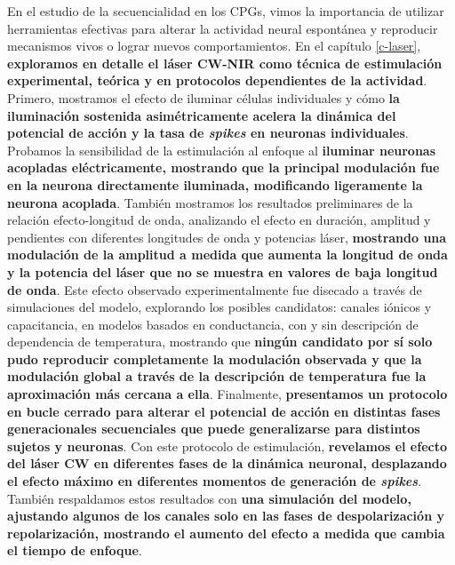 En el estudio de la secuencialidad en los CPGs, vimos la importancia de utilizar herramientas efectivas para alterar la actividad neural espontánea y reproducir mecanismos vivos o lograr nuevos comportamientos. En el capítulo \ref{c-laser}, \textbf{exploramos en detalle el láser CW-NIR como técnica de estimulación experimental, teórica y en protocolos dependientes de la actividad}. Primero, mostramos el efecto de iluminar células individuales y cómo \textbf{la iluminación sostenida asimétricamente acelera la dinámica del potencial de acción y la tasa de \textit{spikes} en neuronas individuales}. Probamos la sensibilidad de la estimulación al enfoque al \textbf{iluminar neuronas acopladas eléctricamente, mostrando que la principal modulación fue en la neurona directamente iluminada, modificando ligeramente la neurona acoplada}. También mostramos los resultados preliminares de la relación efecto-longitud de onda, analizando el efecto en duración, amplitud y pendientes con diferentes longitudes de onda y potencias láser, \textbf{mostrando una modulación de la amplitud a medida que aumenta la longitud de onda y la potencia del láser que no se muestra en valores de baja longitud de onda}. Este efecto observado experimentalmente fue disecado a través de simulaciones del modelo, explorando los posibles candidatos: canales iónicos y capacitancia, en modelos basados en conductancia, con y sin descripción de dependencia de temperatura, mostrando que \textbf{ningún candidato por sí solo pudo reproducir completamente la modulación observada y que la modulación global a través de la descripción de temperatura fue la aproximación más cercana a ella}. Finalmente, \textbf{presentamos un protocolo en bucle cerrado para alterar el potencial de acción en distintas fases generacionales secuenciales que puede generalizarse para distintos sujetos y neuronas}. Con este protocolo de estimulación, \textbf{revelamos el efecto del láser CW en diferentes fases de la dinámica neuronal, desplazando el efecto máximo en diferentes momentos de generación de \textit{spikes}}. También respaldamos estos resultados con \textbf{una simulación del modelo, ajustando algunos de los canales solo en las fases de despolarización y repolarización, mostrando el aumento del efecto a medida que cambia el tiempo de enfoque}.

